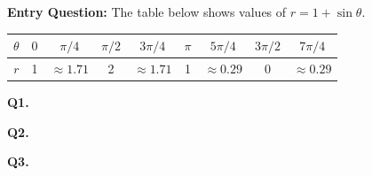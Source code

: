 \documentclass[10pt]{article}
\begin{document}
\vspace{0.08in}

\begin{hookbox}
\textbf{Entry Question:} The table below shows values of $r = 1 + \sin\theta$.

\vspace{4pt}
\renewcommand{\arraystretch}{1.4}
\begin{tabular}{|c|c|c|c|c|c|c|c|c|}
\hline
$\theta$ & $0$ & $\pi/4$ & $\pi/2$ & $3\pi/4$ & $\pi$ & $5\pi/4$ & $3\pi/2$ & $7\pi/4$ \\
\hline
$r$ & 1 & $\approx 1.71$ & 2 & $\approx 1.71$ & 1 & $\approx 0.29$ & 0 & $\approx 0.29$ \\
\hline
\end{tabular}

\vspace{8pt}
\textbf{Q1.} 

\vspace{6pt}
\textbf{Q2.} 

\vspace{6pt}
\textbf{Q3.} 

\end{hookbox}

\vspace{0.08in}
\end{document}
